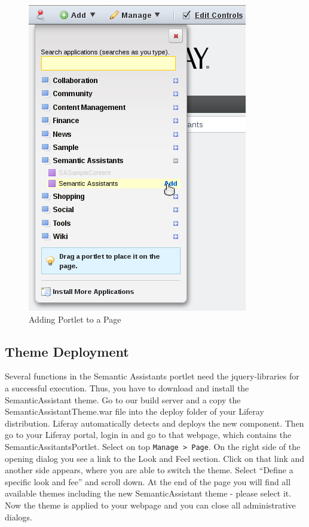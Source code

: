 \begin{figure}
\centering
\includegraphics[scale=0.6]{pictures/liferay_add_portlet.png}
\caption{Adding \sa Portlet to a Page}
\label{fig:liferay_add_portlet}
\end{figure}

\subsection{Theme Deployment}
Several functions in the Semantic Assistants portlet need the jquery-libraries for a successful execution. Thus, you have to download and install the SemanticAssistant theme. Go to our build server and a copy the SemanticAssistantTheme.war file into the deploy folder of your Liferay distribution. Liferay automatically detects and deploys the new component. Then go to your Liferay portal, login in and go to that webpage, which contains the SemanticAssitantsPortlet. Select on top \texttt{Manage \textgreater~Page}. On the right side of the opening dialog you see a link to the Look and Feel section. Click on that link and another side appears, where you are able to switch the theme. Select ``Define a specific look and fee'' and scroll down. At the end of the page you will find all available themes including the new SemanticAssistant theme - please select it. Now the theme is applied to your webpage and you can close all administrative dialogs.

